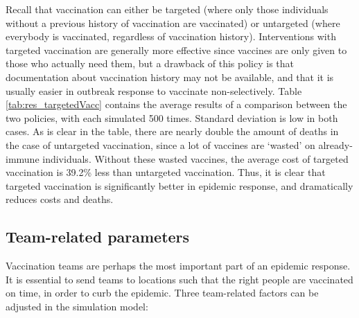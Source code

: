 Recall that vaccination can either be targeted (where only those individuals without a previous history of vaccination are vaccinated) or untargeted (where everybody is vaccinated, regardless of vaccination history). Interventions with targeted vaccination are generally more effective since vaccines are only given to those who actually need them, but a drawback of this policy is that documentation about vaccination history may not be available, and that it is usually easier in outbreak response to vaccinate non-selectively. Table \ref{tab:res_targetedVacc} contains the average results of a comparison between the two policies, with each simulated 500 times. Standard deviation is low in both cases. As is clear in the table, there are nearly double the amount of deaths in the case of untargeted vaccination, since a lot of vaccines are `wasted' on already-immune individuals. Without these wasted vaccines, the average cost of targeted vaccination is 39.2\% less than untargeted vaccination. Thus, it is clear that targeted vaccination is significantly better in epidemic response, and dramatically reduces costs and deaths.


\subsection{Team-related parameters}
Vaccination teams are perhaps the most important part of an epidemic response. It is essential to send teams to locations such that the right people are vaccinated on time, in order to curb the epidemic. Three team-related factors can be adjusted in the simulation model:


